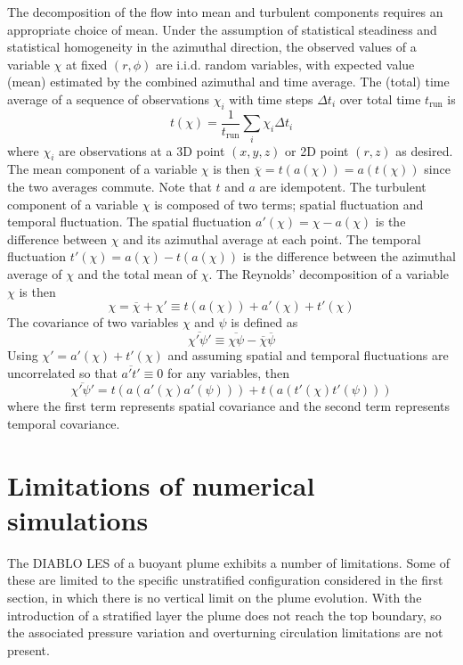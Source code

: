 \documentclass[a4paper]{article}
\begin{document}
The decomposition of the flow into mean and turbulent components requires an appropriate choice of mean. Under
the assumption of statistical steadiness and statistical homogeneity in the azimuthal direction, the observed
values of a variable $\chi$ at fixed $(r,\phi)$ are i.i.d. random variables, with expected value (mean)
estimated by the combined azimuthal and time average. The (total) time average of a sequence of observations
$\chi_i$ with time steps $\Delta t_i$ over total time $t_{\text{run}}$ is
\begin{equation}
	t(\chi) = \frac{1}{t_{\text{run}}} \sum_i \chi_i \Delta t_i
\end{equation}
where $\chi_i$ are observations at a 3D point $(x,y,z)$ or 2D point $(r,z)$ as desired. The mean component
of a variable $\chi$ is then $\overline{\chi} = t(a(\chi)) = a(t(\chi))$ since the two averages commute. Note
that $t$ and $a$ are idempotent. The turbulent component of a variable $\chi$ is composed of two terms;
spatial fluctuation and temporal fluctuation. The spatial fluctuation $a'(\chi) = \chi - a(\chi)$ is the
difference between $\chi$ and its azimuthal average at each point. The temporal fluctuation $t'(\chi) =
a(\chi) - t(a(\chi))$ is the difference between the azimuthal average of $\chi$ and the total mean of $\chi$.
The Reynolds' decomposition of a variable $\chi$ is then
\begin{equation}
	\chi = \overline{\chi} + \chi' \equiv t(a(\chi)) + a'(\chi) + t'(\chi)
\end{equation}
The covariance of two variables $\chi$ and $\psi$ is defined as
\begin{equation}
	\overline{\chi' \psi'} \equiv \overline{\chi\psi} - \overline{\chi}\overline{\psi}
\end{equation}
Using $\chi' = a'(\chi) + t'(\chi)$ and assuming spatial and temporal fluctuations are uncorrelated so that
$\overline{a't'} \equiv 0$ for any variables, then
\begin{equation}
	\overline{\chi' \psi'} = t(a(a'(\chi)a'(\psi))) + t(a(t'(\chi)t'(\psi)))
\end{equation}
where the first term represents spatial covariance and the second term represents temporal covariance.

\section{Limitations of numerical simulations}
\label{app:limitations}

The DIABLO LES of a buoyant plume exhibits a number of limitations. Some of these are limited to the specific
unstratified configuration considered in the first section, in which there is no vertical limit on the plume
evolution. With the introduction of a stratified layer the plume does not reach the top boundary, so the
associated pressure variation and overturning circulation limitations are not present. 
\end{document}
